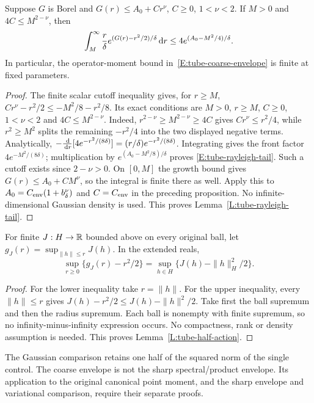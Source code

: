 \begin{lemma}\label{L:tube-rayleigh-tail}
  Suppose $G$ is Borel and $G(r) \le A_0+Cr^\nu$, $C \ge 0$, $1 < \nu < 2$. If
  $M > 0$ and $4C \le M^{2-\nu}$, then
  \begin{equation}\label{E:tube-rayleigh-tail}
    \int_M^\infty\frac r\delta
    e^{(G(r)-r^2/2)/\delta}\,\mathrm{d} r
    \le4e^{(A_0-M^2/4)/\delta}.
  \end{equation}
  In particular, the operator-moment bound in~\eqref{E:tube-coarse-envelope} is
  finite at fixed parameters.
\end{lemma}

\begin{proof}
  The finite scalar cutoff inequality gives, for $r \ge M$, $Cr^\nu-r^2/2 \le
  -M^2/8-r^2/8$. Its exact conditions are $M > 0$, $r \ge M$, $C \ge 0$, $1 <
  \nu < 2$ and $4C \le M^{2-\nu}$. Indeed, $r^{2-\nu} \ge M^{2-\nu} \ge 4C$
  gives $Cr^\nu \le r^2/4$, while $r^2 \ge M^2$ splits the remaining $-r^2/4$
  into the two displayed negative terms. Analytically, $-\frac{\,\mathrm{d}}{\,\mathrm{d}
  r}[4e^{-r^2/(8\delta)}] = (r/\delta)e^{-r^2/(8\delta)}$. Integrating gives the
  front factor $4e^{-M^2/(8\delta)}$; multiplication by $e^{(A_0-M^2/8)/\delta}$
  proves \eqref{E:tube-rayleigh-tail}. Such a cutoff exists since $2-\nu > 0$.
  On $[0,M]$ the growth bound gives $G(r) \le A_0+CM^\nu$, so the integral is
  finite there as well. Apply this to $A_0 = C_{\rm env}(1+b_\delta^\nu)$ and $C
  = C_{\rm env}$ in the preceding proposition. No infinite-dimensional Gaussian
  density is used. This proves Lemma~\ref{L:tube-rayleigh-tail}.
\end{proof}

\begin{lemma}\label{L:tube-half-action}
  For finite $J:H \to \mathbb{R}$ bounded above on every original ball, let $g_J(r) =
  \sup_{\|h\|\le r}J(h)$. In the extended reals,
  \[
    \sup_{r\ge0}\{g_J(r)-r^2/2\}
    =\sup_{h\in H}\{J(h)-\|h\|_H^2/2\}.
  \]
\end{lemma}

\begin{proof}
  For the lower inequality take $r = \|h\|$. For the upper inequality, every
  $\|h\| \le r$ gives $J(h)-r^2/2 \le J(h)-\|h\|^2/2$. Take first the ball
  supremum and then the radius supremum. Each ball is nonempty with finite
  supremum, so no infinity-minus-infinity expression occurs. No compactness,
  rank or density assumption is needed. This proves
  Lemma~\ref{L:tube-half-action}.
\end{proof}

The Gaussian comparison retains one half of the squared norm of the single
control. The coarse envelope is not the sharp spectral/product envelope. Its
application to the original canonical point moment, and the sharp envelope and
variational comparison, require their separate proofs.

